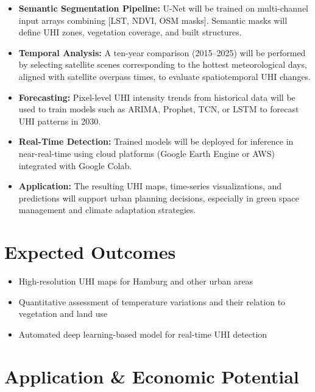 \documentclass{article}
\begin{document}
\begin{itemize}
    \item \textbf{Semantic Segmentation Pipeline:} U-Net will be trained on multi-channel input arrays combining [LST, NDVI, OSM masks]. Semantic masks will define UHI zones, vegetation coverage, and built structures.

    \item \textbf{Temporal Analysis:} A ten-year comparison (2015–2025) will be performed by selecting satellite scenes corresponding to the hottest meteorological days, aligned with satellite overpass times, to evaluate spatiotemporal UHI changes.

    \item \textbf{Forecasting:} Pixel-level UHI intensity trends from historical data will be used to train models such as ARIMA, Prophet, TCN, or LSTM to forecast UHI patterns in 2030.

    \item \textbf{Real-Time Detection:} Trained models will be deployed for inference in near-real-time using cloud platforms (Google Earth Engine or AWS) integrated with Google Colab.

    \item \textbf{Application:} The resulting UHI maps, time-series visualizations, and predictions will support urban planning decisions, especially in green space management and climate adaptation strategies.
\end{itemize}

\section{Expected Outcomes}
\begin{itemize}
    \item High-resolution UHI maps for Hamburg and other urban areas
    \item Quantitative assessment of temperature variations and their relation to vegetation and land use
    \item Automated deep learning-based model for real-time UHI detection
\end{itemize}

\section{Application \& Economic Potential}
\end{document}
